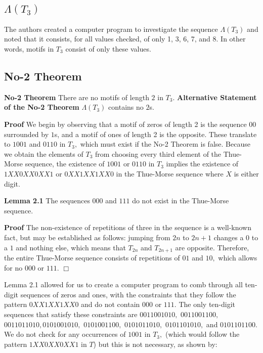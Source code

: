 \documentclass{article}
\begin{document}
\subsection{$\Lambda(T_3)$}

The authors created a computer program to investigate the sequence $\Lambda(T_3)$ and noted that it consists, for all values checked, of only 1, 3, 6, 7, and 8. In other words, motifs in $T_3$ consist of only these values.

\subsection{No-2 Theorem}

\textbf{No-2 Theorem} There are no motifs of length $2$ in $T_3.$
\newline
\textbf{Alternative Statement of the No-2 Theorem} $\Lambda(T_3)$ contains no $2$s.

\textbf{Proof}
We begin by observing that a motif of zeros of length 2 is the sequence $00$ surrounded by $1$s, and a motif of ones of length 2 is the opposite. These translate to $1001$ and $0110$ in $T_3,$ which must exist if the No-2 Theorem is false. Because we obtain the elements of $T_3$ from choosing every third element of the Thue-Morse sequence, the existence of $1001$ or $0110$ in $T_3$ implies the existence of $1XX0XX0XX1$ or $0XX1XX1XX0$ in the Thue-Morse sequence where $X$ is either digit.

\textbf{Lemma 2.1} The sequences $000$ and $111$ do not exist in the Thue-Morse sequence.

\textbf{Proof} The non-existence of repetitions of three in the sequence is a well-known fact, but may be established as follows: jumping from $2n$ to $2n+1$ changes a $0$ to a $1$ and nothing else, which means that $T_{2n}$ and $T_{2n+1}$ are opposite. Therefore, the entire Thue-Morse sequence consists of repetitions of $01$ and $10,$ which allows for no $000$ or $111.$ $\Box$

Lemma 2.1 allowed for us to create a computer program to comb through all ten-digit sequences of zeros and ones, with the constraints that they follow the pattern $0XX1XX1XX0$ and do not contain $000$ or $111.$  The only ten-digit sequences that satisfy these constraints are $0011001010,$ $0011001100,$ $0011011010,$$0101001010,$ $0101001100,$ $0101011010,$ $0101101010,$ and $0101101100.$ We do not check for any occurrences of $1001$ in $T_3,$ (which would follow the pattern $1XX0XX0XX1$ in $T$) but this is not necessary, as shown by:
\end{document}
